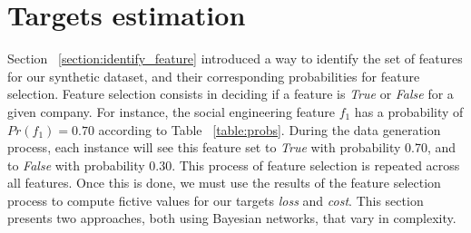 \begin{center}\begin{table}[h!]
	\center
	\noindent{}
\end{table}\end{center}

\section{Targets estimation}\label{sec:target_estimation}

Section ~\ref{section:identify_feature} introduced a way to identify the set of features for our synthetic dataset, and their corresponding probabilities for feature selection. Feature selection consists in deciding if a feature is \textit{True} or \textit{False} for a given company. For instance, the social engineering feature $f_1$ has a probability of $Pr(f_1) = 0.70$ according to Table ~\ref{table:probs}. During the data generation process, each instance will see this feature set to \textit{True} with probability 0.70, and to \textit{False} with probability 0.30. This process of feature selection is repeated across all features. Once this is done, we must use the results of the feature selection process to compute fictive values for our targets \textit{loss} and \textit{cost}. This section presents two approaches, both using Bayesian networks, that vary in complexity.


